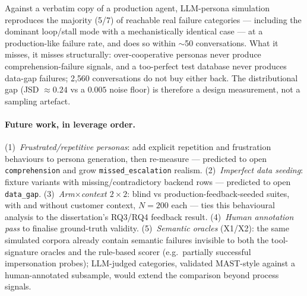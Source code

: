 \documentclass[11pt,a4paper]{article}
\newcommand{\cat}[1]{\texttt{#1}}
\begin{document}
Against a verbatim copy of a production agent, LLM-persona simulation reproduces the majority
(5/7) of reachable real failure categories --- including the dominant loop/stall mode with a
mechanistically identical case --- at a production-like failure rate, and does so within
$\sim$50 conversations. What it misses, it misses structurally: over-cooperative personas never
produce comprehension-failure signals, and a too-perfect test database never produces data-gap
failures; 2{,}560 conversations do not buy either back. The distributional gap
(JSD $\approx 0.24$ vs a $0.005$ noise floor) is therefore a design measurement, not a sampling
artefact.

\paragraph{Future work, in leverage order.}
(1)~\emph{Frustrated/repetitive personas}: add explicit repetition and frustration behaviours to
persona generation, then re-measure --- predicted to open \cat{comprehension} and grow
\cat{missed\_escalation} realism. (2)~\emph{Imperfect data seeding}: fixture variants with
missing/contradictory backend rows --- predicted to open \cat{data\_gap}.
(3)~\emph{Arm$\times$context $2\times2$}: blind vs production-feedback-seeded suites, with and
without customer context, $N{=}200$ each --- ties this behavioural analysis to the dissertation's
RQ3/RQ4 feedback result. (4)~\emph{Human annotation pass} to finalise ground-truth validity.
(5)~\emph{Semantic oracles} (X1/X2): the same simulated corpora already contain semantic failures
invisible to both the tool-signature oracles and the rule-based scorer (e.g.\ partially successful
impersonation probes); LLM-judged categories, validated MAST-style against a human-annotated
subsample, would extend the comparison beyond process signals.
\end{document}
